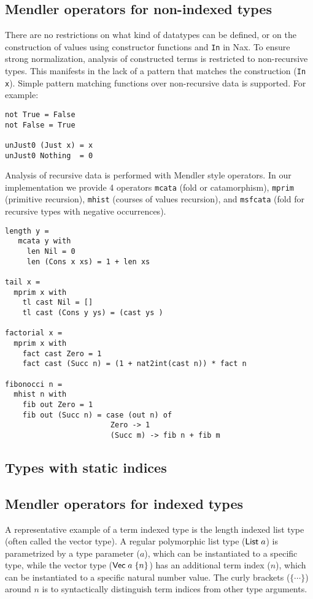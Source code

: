\subsection{Mendler operators for non-indexed types}
There are no restrictions on what kind of datatypes
can be defined, or on the construction of values using constructor
functions and \verb+In+ in Nax. To ensure strong normalization, analysis of constructed
terms is restricted to non-recursive types. This manifests in the lack of
a pattern that matches the construction (\verb+In x+). Simple pattern matching functions
over non-recursive data is supported. For example:

{\small
\begin{verbatim}
not True = False
not False = True

unJust0 (Just x) = x
unJust0 Nothing  = 0
\end{verbatim}}
Analysis of recursive data is performed with Mendler style operators. In our
implementation we provide 4 operators \verb+mcata+ (fold or catamorphism), 
\verb+mprim+ (primitive recursion), \verb+mhist+ (courses of values recursion),
and \verb+msfcata+ (fold for recursive types with negative occurrences).

{\small
\begin{verbatim}
length y = 
   mcata y with
     len Nil = 0
     len (Cons x xs) = 1 + len xs

tail x = 
  mprim x with
    tl cast Nil = []
    tl cast (Cons y ys) = (cast ys )
    
factorial x =
  mprim x with
    fact cast Zero = 1
    fact cast (Succ n) = (1 + nat2int(cast n)) * fact n
                      
fibonocci n =
  mhist n with
    fib out Zero = 1
    fib out (Succ n) = case (out n) of
                        Zero -> 1
                        (Succ m) -> fib n + fib m 
\end{verbatim}}


\subsection{Types with static indices}\label{sec:bg:ixty}


\subsection{Mendler operators for indexed types}

A representative example of a term
indexed type is the length indexed list type (often called the vector type).
A regular polymorphic list type ($\mathsf{List}\;a$) is parametrized by a type
parameter ($a$), which can be instantiated to a specific type, while the
vector type ($\mathsf{Vec}\;a\;\{n\}$) has an additional term index ($n$), which
can be instantiated to a specific natural number value. The curly brackets
($\{\cdots\}$) around $n$ is to syntactically distinguish term indices from
other type arguments. 

